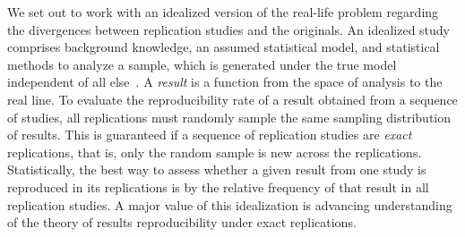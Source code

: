 \documentclass[meta,authordate]{jote-new-article}
\newcounter{result}
\begin{document}
We set out to work with an idealized version of the real-life problem regarding the divergences between replication studies and the originals. An idealized study comprises background knowledge, an assumed statistical model, and statistical methods to analyze a sample, which is  generated under the true model independent of all else~\parencite{Devezer2021}. A {\em result} is a function from the space of analysis to the real line. To evaluate the reproducibility rate of a result obtained from a sequence of studies, all replications must randomly sample the same sampling distribution of results. This is guaranteed if a sequence of replication studies are {\em exact} replications, that is, only the random sample is new across the replications. Statistically, the best way to assess whether a given result from one study is reproduced in its replications is by the relative frequency of that result in all replication studies. A major value of this idealization is advancing understanding of the theory of results reproducibility under exact replications.
\end{document}

